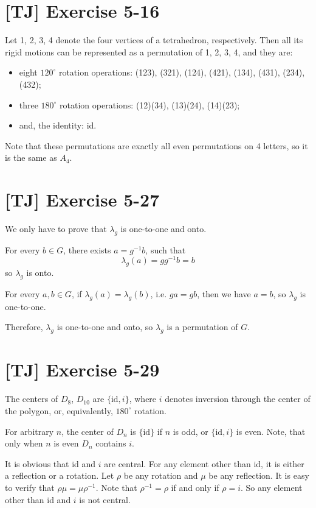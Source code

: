 \documentclass[a4paper,11pt,twocolumn]{article}
\begin{document}
  \section{[TJ] Exercise 5-16}
  Let 1, 2, 3, 4 denote the four vertices of a tetrahedron, respectively. Then all its rigid motions can be represented as a permutation of 1, 2, 3, 4, and they are:
  \begin{itemize}
    \item eight $120^\circ$ rotation operations: (123), (321), (124), (421), (134), (431), (234), (432);
    \item three $180^\circ$ rotation operations: (12)(34), (13)(24), (14)(23);
    \item and, the identity: id.
  \end{itemize}
  Note that these permutations are exactly all even permutations on 4 letters, so it is the same as $A_4$.

  \section{[TJ] Exercise 5-27}
  We only have to prove that $\lambda_g$ is one-to-one and onto. \par
  For every $b \in G$, there exists $a = g^{-1}b$, such that
  $$ \lambda_g(a) = gg^{-1}b = b$$
  so $\lambda_g$ is onto. \par
  For every $a, b \in G$, if $\lambda_g(a) = \lambda_g(b)$, i.e. $ga = gb$, then we have $a = b$, so $\lambda_g$ is one-to-one. \par
  Therefore, $\lambda_g$ is one-to-one and onto, so $\lambda_g$ is a permutation of $G$.

  \section{[TJ] Exercise 5-29}
  The centers of $D_8$, $D_{10}$ are $\{\text{id}, i\}$, where $i$ denotes inversion through the center of the polygon, or, equivalently, $180^\circ$ rotation. \par
  For arbitrary $n$, the center of $D_n$ is $\{\text{id}\}$ if $n$ is odd, or $\{\text{id}, i\}$ is even. Note, that only when $n$ is even $D_n$ contains $i$. \par
  It is obvious that id and $i$ are central. For any element other than id, it is either a reflection or a rotation. Let $\rho$ be any rotation and $\mu$ be any reflection. It is easy to verify that $\rho \mu = \mu \rho^{-1}$. Note that $\rho^{-1} = \rho$ if and only if $\rho = i$. So any element other than id and $i$ is not central.
\end{document}
